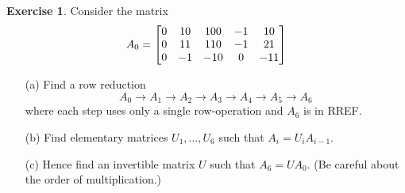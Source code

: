 \documentclass[a4paper]{amsart}
\theoremstyle{definition}
\newtheorem{exercise}{Exercise}
\begin{document}
\begin{exercise}\label{ex-elementary-i}
 Consider the matrix
 \[ A_0 = \left[\begin{matrix} 0 & 10 & 100 & -1 &  10 \\
               0 & 11 & 110 & -1 &  21 \\
               0 & -1 & -10 &  0 & -11
          \end{matrix}\right]
 \]
 \begin{itemize}
  \item[(a)] Find a row reduction 
   \[ A_0 \to A_1 \to A_2 \to A_3 \to A_4 \to A_5 \to A_6 \]
   where each step uses only a single row-operation and $A_6$ is in
   RREF.
  \item[(b)] Find elementary matrices $U_1,\dotsc,U_6$ such that
   $A_i=U_iA_{i-1}$.
  \item[(c)] Hence find an invertible matrix $U$ such that
   $A_6=UA_0$.  (Be careful about the order of multiplication.)
 \end{itemize}
\end{exercise}
\end{document}
